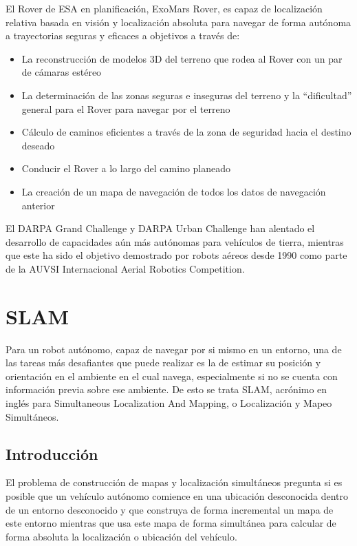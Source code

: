 El Rover de ESA en planificación, ExoMars Rover, es capaz de localización relativa basada en visión y localización absoluta para navegar de forma autónoma a trayectorias seguras y eficaces a objetivos a través de:

\begin{itemize}
	\itemsep1pt \parskip1pt 
	\item La reconstrucción de modelos 3D del terreno que rodea al Rover con un par de cámaras estéreo
	\item La determinación de las zonas seguras e inseguras del terreno y la ``dificultad'' general para el Rover para navegar por el terreno
	\item Cálculo de caminos eficientes a través de la zona de seguridad hacia el destino deseado
	\item Conducir el Rover a lo largo del camino planeado
	\item La creación de un mapa de navegación de todos los datos de navegación anterior
\end{itemize}

El DARPA Grand Challenge y DARPA Urban Challenge han alentado el desarrollo de capacidades aún más autónomas para vehículos de tierra, mientras que este ha sido el objetivo demostrado por robots aéreos desde 1990 como parte de la AUVSI Internacional Aerial Robotics Competition.

\section{SLAM}
Para un robot autónomo, capaz de navegar por si mismo en un entorno, una de las tareas más desafiantes que puede realizar es la de estimar su posición y orientación en el ambiente en el cual navega, especialmente si no se cuenta con información previa sobre ese ambiente. De esto se trata SLAM, acrónimo en inglés para Simultaneous Localization And Mapping, o Localización y Mapeo Simultáneos.

\subsection{Introducción}
El problema de construcción de mapas y localización simultáneos pregunta si es posible que un vehículo autónomo comience en una ubicación desconocida dentro de un entorno desconocido y que construya de forma incremental un mapa de este entorno mientras que usa este mapa de forma simultánea para calcular de forma absoluta la localización o ubicación del vehículo.

